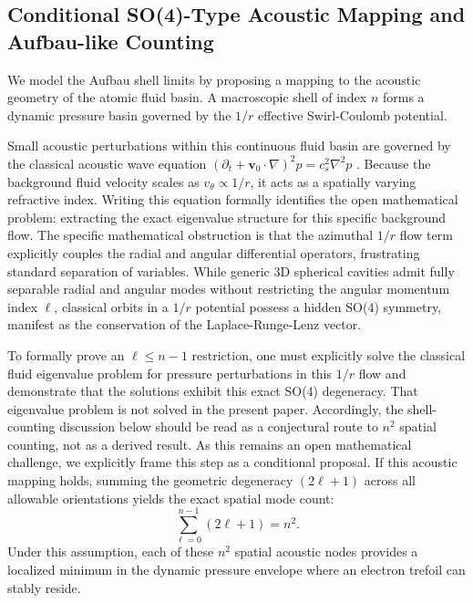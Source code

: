 \documentclass[11pt,a4paper]{article}
\begin{document}
    \subsection{Conditional SO(4)-Type Acoustic Mapping and Aufbau-like Counting}
        We model the Aufbau shell limits by proposing a mapping to the acoustic geometry of the atomic fluid basin. A macroscopic shell of index $n$ forms a dynamic pressure basin governed by the $1/r$ effective Swirl-Coulomb potential.
        
        Small acoustic perturbations within this continuous fluid basin are governed by the classical acoustic wave equation $(\partial_t + \mathbf{v}_0 \cdot \nabla)^2 p = c_s^2 \nabla^2 p$ \cite{Rayleigh1877}. Because the background fluid velocity scales as $v_\theta \propto 1/r$, it acts as a spatially varying refractive index. Writing this equation formally identifies the open mathematical problem: extracting the exact eigenvalue structure for this specific background flow. The specific mathematical obstruction is that the azimuthal $1/r$ flow term explicitly couples the radial and angular differential operators, frustrating standard separation of variables. While generic 3D spherical cavities admit fully separable radial and angular modes without restricting the angular momentum index $\ell$, classical orbits in a $1/r$ potential possess a hidden SO(4) symmetry, manifest as the conservation of the Laplace-Runge-Lenz vector. 
        
        To formally prove an $\ell \le n-1$ restriction, one must explicitly solve the classical fluid eigenvalue problem for pressure perturbations in this $1/r$ flow and demonstrate that the solutions exhibit this exact SO(4) degeneracy. That eigenvalue problem is not solved in the present paper. Accordingly, the shell-counting discussion below should be read as a conjectural route to $n^2$ spatial counting, not as a derived result. As this remains an open mathematical challenge, we explicitly frame this step as a conditional proposal. If this acoustic mapping holds, summing the geometric degeneracy $(2\ell + 1)$ across all allowable orientations yields the exact spatial mode count:
        \begin{equation}
            \label{eq:SphericalHarmonics}
            \sum_{\ell=0}^{n-1} (2\ell + 1) = n^2.
        \end{equation}
        Under this assumption, each of these $n^2$ spatial acoustic nodes provides a localized minimum in the dynamic pressure envelope where an electron trefoil can stably reside.
        
\end{document}
